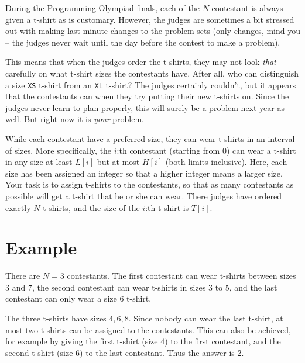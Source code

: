 \newcommand\version{v1}
During the Programming Olympiad finals, each of the $N$ contestant is always given a t-shirt as is customary. However, the judges
are sometimes a bit stressed out with making last minute changes to the problem sets (only changes, mind you -- the judges
never wait until the day before the contest to make a problem).

This means that when the judges order the t-shirts, they may not look \emph{that} carefully on what t-shirt
sizes the contestants have. After all, who can distinguish
a size \texttt{XS} t-shirt from an \texttt{XL} t-shirt? The judges certainly couldn't, but it appears that the contestants can when they try putting their new t-shirts on. 
Since the judges never learn to plan properly, this will surely be a problem next year as well. But right now it is \emph{your} problem.

While each contestant have a preferred size, they can wear t-shirts in an interval of sizes. More specifically,
the $i$:th contestant (starting from 0) can wear a t-shirt in any size at least $L[i]$ but at most $H[i]$ (both limits inclusive). 
Here, each size has been assigned an integer so that a higher integer means a larger size.
Your task is to assign t-shirts to the contestants, so that as many contestants as possible will get a t-shirt
that he or she can wear. There judges have ordered exactly $N$ t-shirts, and the size of the $i$:th t-shirt is $T[i]$.

\section*{Example}
There are $N = 3$ contestants. The first contestant can wear t-shirts between sizes $3$ and $7$,
the second contestant can wear t-shirts in sizes $3$ to $5$, and the last contestant can only wear a size $6$ t-shirt.

The three t-shirts have sizes $4, 6, 8$. Since nobody can wear the last t-shirt, at most two t-shirts
can be assigned to the contestants. This can also be achieved, for example by giving the first t-shirt (size $4$) to
the first contestant, and the second t-shirt (size $6$) to the last contestant. Thus the answer is 2.

